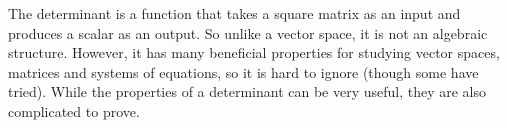 \begin{para}The determinant is a function that takes a square matrix as an input and produces a scalar as an output.  So unlike a vector space, it is not an algebraic structure.  However, it has many beneficial properties for studying vector spaces, matrices and systems of equations, so it is hard to ignore (though some have tried).  While the properties of a determinant can be very useful, they are also complicated to prove.\end{para}
